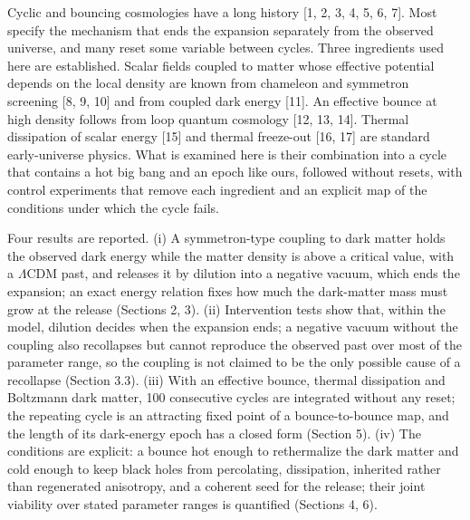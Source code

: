 \documentclass[11pt,a4paper]{article}
\begin{document}
Cyclic and bouncing cosmologies have a long history [1, 2, 3, 4, 5, 6, 7]. Most specify the mechanism that ends the expansion separately from the observed universe, and many reset some variable between cycles. Three ingredients used here are established. Scalar fields coupled to matter whose effective potential depends on the local density are known from chameleon and symmetron screening [8, 9, 10] and from coupled dark energy [11]. An effective bounce at high density follows from loop quantum cosmology [12, 13, 14]. Thermal dissipation of scalar energy [15] and thermal freeze-out [16, 17] are standard early-universe physics. What is examined here is their combination into a cycle that contains a hot big bang and an epoch like ours, followed without resets, with control experiments that remove each ingredient and an explicit map of the conditions under which the cycle fails.

Four results are reported. (i) A symmetron-type coupling to dark matter holds the observed dark energy while the matter density is above a critical value, with a $\Lambda$CDM past, and releases it by dilution into a negative vacuum, which ends the expansion; an exact energy relation fixes how much the dark-matter mass must grow at the release (Sections 2, 3). (ii) Intervention tests show that, within the model, dilution decides when the expansion ends; a negative vacuum without the coupling also recollapses but cannot reproduce the observed past over most of the parameter range, so the coupling is not claimed to be the only possible cause of a recollapse (Section 3.3). (iii) With an effective bounce, thermal dissipation and Boltzmann dark matter, 100 consecutive cycles are integrated without any reset; the repeating cycle is an attracting fixed point of a bounce-to-bounce map, and the length of its dark-energy epoch has a closed form (Section 5). (iv) The conditions are explicit: a bounce hot enough to rethermalize the dark matter and cold enough to keep black holes from percolating, dissipation, inherited rather than regenerated anisotropy, and a coherent seed for the release; their joint viability over stated parameter ranges is quantified (Sections 4, 6).
\end{document}
